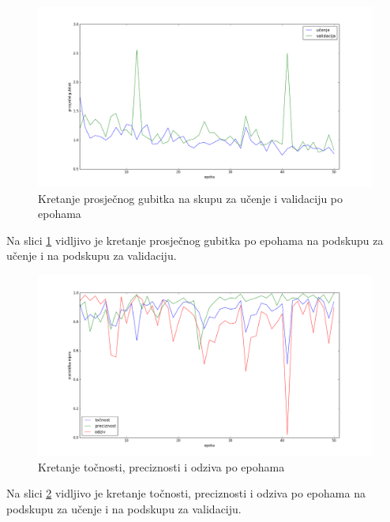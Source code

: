 \documentclass[times, utf8, diplomski, numeric]{fer}
\begin{document}
\begin{figure}[H]
\centering
\includegraphics[scale=0.35]{images/single_hand_scale075_loss.png}
\caption{Kretanje prosječnog gubitka na skupu za učenje i validaciju po epohama}
\label{img:single_hand_scale075_loss}
\end{figure}
\noindent Na slici \ref{img:single_hand_scale075_loss} vidljivo je kretanje prosječnog gubitka po epohama na podskupu za učenje i na podskupu za validaciju.

\begin{figure}[H]
\centering
\includegraphics[scale=0.35]{images/single_hand_scale075_acc_ap.png}
\caption{Kretanje točnosti, preciznosti i odziva po epohama}
\label{img:single_hand_scale075_acc_ap}
\end{figure}
\noindent Na slici \ref{img:single_hand_scale075_acc_ap} vidljivo je kretanje točnosti, preciznosti i odziva po epohama na podskupu za učenje i na podskupu za validaciju.
\end{document}

